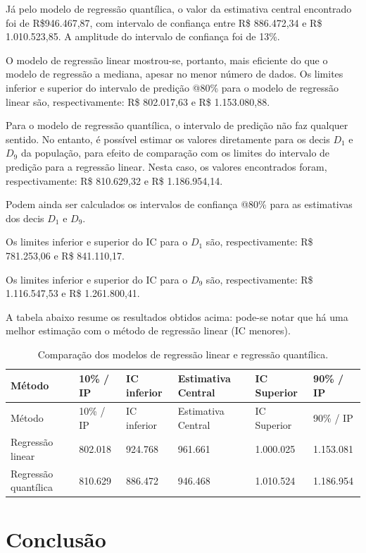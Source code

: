 \documentclass[a4paper, 12pt]{article}
\begin{document}
Já pelo modelo de regressão quantílica, o valor da estimativa central
encontrado foi de R\$946.467,87, com intervalo de confiança entre R\$
886.472,34 e R\$ 1.010.523,85. A amplitude do intervalo de confiança foi
de 13\%.

O modelo de regressão linear mostrou-se, portanto, mais eficiente do que
o modelo de regressão a mediana, apesar no menor número de dados. Os
limites inferior e superior do intervalo de predição @80\% para o modelo
de regressão linear são, respectivamente: R\$ 802.017,63 e R\$
1.153.080,88.

Para o modelo de regressão quantílica, o intervalo de predição não faz
qualquer sentido. No entanto, é possível estimar os valores diretamente
para os decis \(D_1\) e \(D_9\) da população, para efeito de comparação
com os limites do intervalo de predição para a regressão linear. Nesta
caso, os valores encontrados foram, respectivamente: R\$ 810.629,32 e
R\$ 1.186.954,14.

Podem ainda ser calculados os intervalos de confiança @80\% para as
estimativas dos decis \(D_1\) e \(D_9\).

Os limites inferior e superior do IC para o \(D_1\) são,
respectivamente: R\$ 781.253,06 e R\$ 841.110,17.

Os limites inferior e superior do IC para o \(D_9\) são,
respectivamente: R\$ 1.116.547,53 e R\$ 1.261.800,41.

A tabela abaixo resume os resultados obtidos acima: pode-se notar que há
uma melhor estimação com o método de regressão linear (IC menores).

\begin{longtable}[]{@{}llllll@{}}
\caption{Comparação dos modelos de regressão linear e regressão
quantílica.}\tabularnewline
\toprule
Método & 10\% / IP & IC inferior & Estimativa Central & IC Superior &
90\% / IP\tabularnewline
\midrule
\endfirsthead
\toprule
Método & 10\% / IP & IC inferior & Estimativa Central & IC Superior &
90\% / IP\tabularnewline
\midrule
\endhead
Regressão linear & 802.018 & 924.768 & 961.661 & 1.000.025 &
1.153.081\tabularnewline
Regressão quantílica & 810.629 & 886.472 & 946.468 & 1.010.524 &
1.186.954\tabularnewline
\bottomrule
\end{longtable}

\hypertarget{conclusao}{%
\section{Conclusão}\label{conclusao}}
\end{document}

